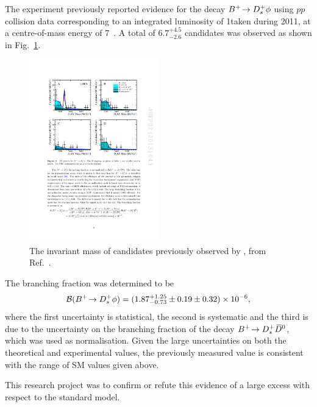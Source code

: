 The \lhcb experiment previously reported evidence for the decay ${{{B}^+}}\!\rightarrow {\ensuremath{{D}^+_{s}}}\phi$ using $pp$ collision data corresponding to an integrated luminosity of 1\invfb taken during 2011, at a centre-of-mass energy of 7\tev~\cite{LHCb-PAPER-2012-025}. A total of $6.7^{+4.5}_{-2.6}$ candidates was observed as shown in Fig.~\ref{fig:Theory_prev_B2DsPhi}. 
\begin{figure}[!h]
    \centering
    \includegraphics[width=0.5\textwidth]{figs/Theory/Prev_B2DsPhi.pdf}
    \caption{The invariant mass of \decay{\Bp}{\Dsp\phiz} candidates previously observed by \lhcb, from Ref.~\cite{LHCb-PAPER-2012-025}. }
    \label{fig:Theory_prev_B2DsPhi}   
\end{figure}
The branching fraction was determined to be 
\begin{equation}
\mathcal{B}({{{B}^+}}\!\rightarrow {\ensuremath{{D}^+_{s}}}\phi) = (1.87^{+1.25}_{-0.73} \pm 0.19 \pm 0.32) \times 10^{-6},
\end{equation}
where the first uncertainty is statistical, the second is systematic and the third is due to the uncertainty on the branching fraction of the decay ${{{B}^+}}\!\rightarrow {\ensuremath{{D}^+_{s}}}{\ensuremath{{\kern 0.2em\overline{\kern -0.2em D}{}}{}^0}}$, which was used as normalisation. 
Given the large uncertainties on both the theoretical and experimental values, the previously measured value is consistent with the range of SM values given above.

This research project was to confirm or refute this evidence of a large excess with respect to the standard model.



